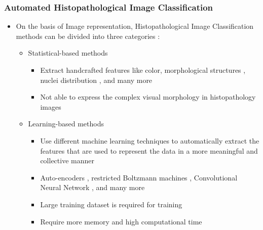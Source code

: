 \documentclass [9pt,times] {beamer}
\begin{document}
\begin{frame}\frametitle{Automated Histopathological Image Classification}
\begin{itemize}
\justifying
\item On the basis of Image representation, Histopathological Image Classification methods can be divided into three categories \cite{gutierrez2013}: \\[0.2cm]
		\begin{itemize}
			\item  \textcolor[rgb]{0.00,0.00,1.00}{Statistical-based methods}  \\[0.1cm]%
					\begin{itemize}
						\item Extract handcrafted features like color, morphological structures \cite{difranco2011}, nuclei distribution \cite{zhang2013}, and many more  \\[0.1cm]
						\item \textcolor[rgb]{1.00,0.00,0.00}{Not able to express the complex visual morphology} in histopathology images \cite{qureshi2009} \cite{gutierrez2013}

					\end{itemize}
			\item  \textcolor[rgb]{0.00,0.00,1.00}{Learning-based methods} %
					\begin{itemize}
							\item Use different machine learning techniques to automatically extract the features that are used to represent the data in a more meaningful and collective manner \\[0.1cm]
							\item Auto-encoders \cite{cruz2013, xu2016}, restricted Boltzmann machines \cite{nayak2013, chang2013},  Convolutional Neural Network \cite{malon2008, hou2016}, and many more \cite{Bayramoglu2016, Saha2018, Bosnacki2019} \\[0.1cm]
\item  \textcolor[rgb]{1.00,0.00,0.00}{Large training dataset is required for training}
							\item \textcolor[rgb]{1.00,0.00,0.00}{Require more memory and high computational time} \cite{gutierrez2013}

					\end{itemize}


\end{itemize}
\end{itemize}
\end{frame}
\end{document}
